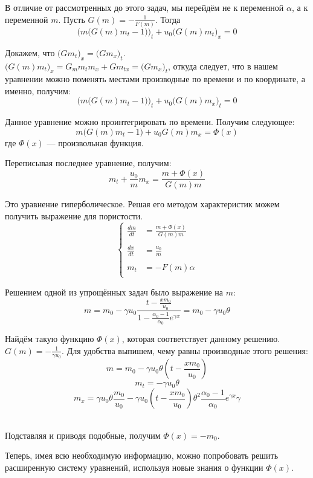 \documentclass[a4paper,12pt]{article}
\renewcommand{\d}{\displaystyle}
\begin{document}
\par В отличие от рассмотренных до этого задач, мы перейдём не к переменной $\alpha$, а к переменной $m$. Пусть $\d G(m) = -\frac{1}{F(m)}$. Тогда
$$\Big(m \big(G(m)m_{t} - 1\big)\Big)_{t} + u_{0}\big(G(m)m_{t}\big)_{x} = 0$$

\par Докажем, что $\big(G m_{t}\big)_{x} = \big(G m_{x}\big)_{t}$.\\
$\d \big(G(m)m_{t}\big)_{x} = G_{m}m_{t}m_{x} + G m_{tx} = \big(G m_{x}\big)_{t}$, откуда следует, что в нашем уравнении можно поменять местами производные по времени и по координате, а именно, получим:
$$\Big(m \big(G(m)m_{t} - 1\big)\Big)_{t} + u_{0}\big(G(m)m_{x}\big)_{t} = 0$$
\par Данное уравнение можно проинтегрировать по времени. Получим следующее:\\
$$m \big(G(m)m_{t} - 1\big) + u_{0}G(m)m_{x} = \Phi(x)$$
где $\Phi(x)$ --- произвольная функция.
\par Переписывая последнее уравнение, получим:
$$m_{t}+\frac{u_{0}}{m}m_{x}=\frac{m+\Phi(x)}{G(m)m}$$
\par Это уравнение гиперболическое. Решая его методом характеристик можем получить выражение для пористости.\\
\begin{equation*}
\begin{cases}

\d \frac{dm}{dt} &= \d \frac{m+\Phi(x)}{G(m)m}\\
&\\
\d \frac{dx}{dt}&= \d \frac{u_{0}}{m}\\
&\\
m_{t} &= -F(m)\alpha\\

\end{cases}
\end{equation*}

\par Решением одной из упрощённых задач было выражение на $m$:\\
$$m = m_{0} - \gamma u_{0}\frac{t-\frac{xm_{0}}{u_{0}}}{1 - \frac{\alpha_{0}-1}{\alpha_{0}}e^{\gamma x}}=m_{0}-\gamma u_{0}\theta$$
\par Найдём такую функцию $\Phi(x)$, которая соответствует данному решению. $G(m)=-\frac{1}{\gamma u_{0}}$. Для удобства выпишем, чему равны производные этого решения:\\
$$m = m_{0} - \gamma u_{0}\theta(t-\frac{xm_{0}}{u_{0}})$$
$$m_{t} = -\gamma u_{0}\theta$$
$$m_{x} = \gamma u_{0}\theta\frac{m_{0}}{u_{0}}-\gamma u_{0}(t-\frac{xm_{0}}{u_{0}})\theta^{2}\frac{\alpha_{0}-1}{\alpha_{0}}e^{\gamma x}\gamma$$\\
\par Подставляя и приводя подобные, получим $\Phi(x)=-m_{0}$.
\par Теперь, имея всю необходимую информацию, можно попробовать решить расширенную систему уравнений, используя новые знания о функции $\Phi(x)$.
\end{document}
